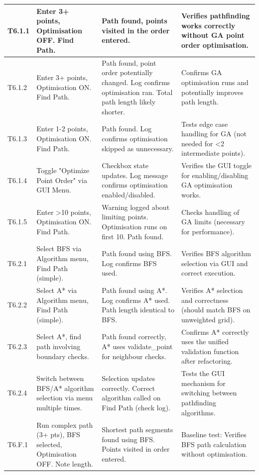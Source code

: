 \begin{longtable}{|p{}|p{}|p{}|p{}|}
	T6.1.1 & Enter 3+ points, Optimisation OFF. Find Path. & Path found, points visited in the order entered. & Verifies pathfinding works correctly without GA point order optimisation. \\
	\hline
	T6.1.2 & Enter 3+ points, Optimisation ON. Find Path. & Path found, point order potentially changed. Log confirms optimisation ran. Total path length likely shorter. & Confirms GA optimisation runs and potentially improves path length. \\
	\hline
	T6.1.3 & Enter 1-2 points, Optimisation ON. Find Path. & Path found. Log confirms optimisation skipped as unnecessary. & Tests edge case handling for GA (not needed for <2 intermediate points). \\
	\hline
	T6.1.4 & Toggle "Optimize Point Order" via GUI Menu. & Checkbox state updates. Log message confirms optimisation enabled/disabled. & Verifies the GUI toggle for enabling/disabling GA optimisation works. \\
	\hline
	T6.1.5 & Enter >10 points, Optimisation ON. Find Path. & Warning logged about limiting points. Optimisation runs on first 10. Path found. & Checks handling of GA limits (necessary for performance). \\
	\hline
	T6.2.1 & Select BFS via Algorithm menu, Find Path (simple). & Path found using BFS. Log confirms BFS used. & Verifies BFS algorithm selection via GUI and correct execution. \\
	\hline
	T6.2.2 & Select A* via Algorithm menu, Find Path (simple). & Path found using A*. Log confirms A* used. Path length identical to BFS. & Verifies A* selection and correctness (should match BFS on unweighted grid). \\
	\hline
	T6.2.3 & Select A*, find path involving boundary checks. & Path found correctly, A* uses validate\_point for neighbour checks. & Confirms A* correctly uses the unified validation function after refactoring. \\
	\hline
	T6.2.4 & Switch between BFS/A* algorithm selection via menu multiple times. & Selection updates correctly. Correct algorithm called on Find Path (check log). & Tests the GUI mechanism for switching between pathfinding algorithms. \\
	\hline
	T6.F.1 & Run complex path (3+ pts), BFS selected, Optimisation OFF. Note length. & Shortest path segments found using BFS. Points visited in order entered. & Baseline test: Verifies BFS path calculation without optimisation. \\

\end{longtable}
